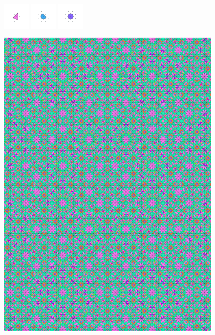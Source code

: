 \documentclass[text.tex]{subfiles}
\begin{document}
\begin{figure}[h!]
\includegraphics[width=0.12\textwidth]{img/results/octagon/octagon_229289_(7_-1alpha_2)_014.pdf}
\includegraphics[width=0.12\textwidth]{img/results/octagon/octagon_229289_(7_-1alpha_2)_015.pdf}
\includegraphics[width=0.12\textwidth]{img/results/octagon/octagon_229289_(7_-1alpha_2)_016.pdf}
\end{figure}

\begin{figure}[h!]
\centering
\includegraphics[width=1\textwidth]{img/results/octagon/quasi_polygon-octagon_229289_(7_-1alpha_2).pdf}
\end{figure}
\end{document}
